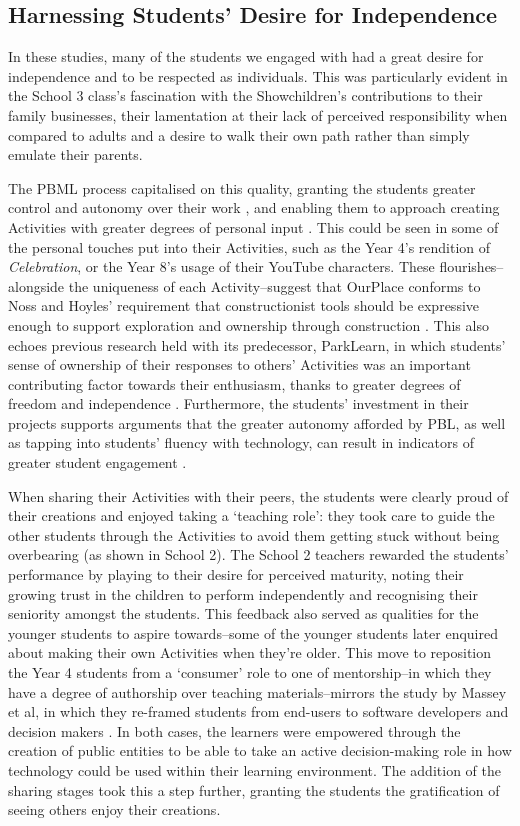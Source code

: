 \documentclass[,hyphens]{sigchi}
\begin{document}
\subsection{Harnessing Students' Desire for Independence}
In these studies, many of the students we engaged with had a great desire for independence and to be respected as individuals. This was particularly evident in the School 3 class's fascination with the Showchildren's contributions to their family businesses, their lamentation at their lack of perceived responsibility when compared to adults and a desire to walk their own path rather than simply emulate their parents.

The PBML process capitalised on this quality, granting the students greater control and autonomy over their work \cite{Noss2017, Wurdinger2007}, and enabling them to approach creating Activities with greater degrees of personal input \cite{Richardson2017}. This could be seen in some of the personal touches put into their Activities, such as the Year 4's rendition of \textit{Celebration}, or the Year 8's usage of their YouTube characters. These flourishes--alongside the uniqueness of each Activity--suggest that OurPlace conforms to Noss and Hoyles' requirement that constructionist tools should be expressive enough to support exploration and ownership through construction \cite{Noss2017}. This also echoes previous research held with its predecessor, ParkLearn, in which students' sense of ownership of their responses to others' Activities was an important contributing factor towards their enthusiasm, thanks to greater degrees of freedom and independence \cite{Richardson2018}. Furthermore, the students' investment in their projects supports arguments that the greater autonomy afforded by PBL, as well as tapping into students' fluency with technology, can result in indicators of greater student engagement \cite{Wurdinger2007, Bell2010}.

When sharing their Activities with their peers, the students were clearly proud of their creations and enjoyed taking a `teaching role': they took care to guide the other students through the Activities to avoid them getting stuck without being overbearing (as shown in School 2). The School 2 teachers rewarded the students' performance by playing to their desire for perceived maturity, noting their growing trust in the children to perform independently and recognising their seniority amongst the students. This feedback also served as qualities for the younger students to aspire towards--some of the younger students later enquired about making their own Activities when they're older. This move to reposition the Year 4 students from a `consumer' role to one of mentorship--in which they have a degree of authorship over teaching materials--mirrors the study by Massey et al, in which they re-framed students from end-users to software developers and decision makers \cite{Massey2006}. In both cases, the learners were empowered through the creation of public entities to be able to take an active decision-making role in how technology could be used within their learning environment. The addition of the sharing stages took this a step further, granting the students the gratification of seeing others enjoy their creations.
 
\end{document}
